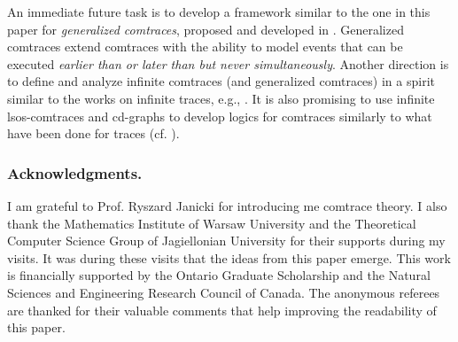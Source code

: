 \documentclass{llncs}
\begin{document}
An immediate future task is to develop a framework similar to the one in this paper for \emph{generalized comtraces}, proposed and developed in \cite{JL08,Le,JL09}. Generalized comtraces extend comtraces with the ability to model events that can be executed \emph{earlier than or later than but never simultaneously}. Another direction is to define and analyze infinite comtraces (and generalized comtraces) in a spirit similar  to the works on infinite traces, e.g., \cite{Gas90,Die91}. It is also promising to use infinite lsos-comtraces and cd-graphs  to develop logics for comtraces similarly to what have been done for traces (cf. \cite{TW02,DHK07}). 

\subsubsection*{Acknowledgments.} I am grateful to Prof. Ryszard Janicki for introducing me  comtrace theory. I also thank the Mathematics Institute of Warsaw University and the Theoretical Computer Science Group of Jagiellonian University for their supports during my visits. It was during these visits that the ideas from this paper emerge. This work is financially  supported by the Ontario Graduate Scholarship and the Natural Sciences and Engineering Research Council of Canada. The anonymous referees are thanked for their valuable comments that help improving the readability of this paper.
\end{document}

